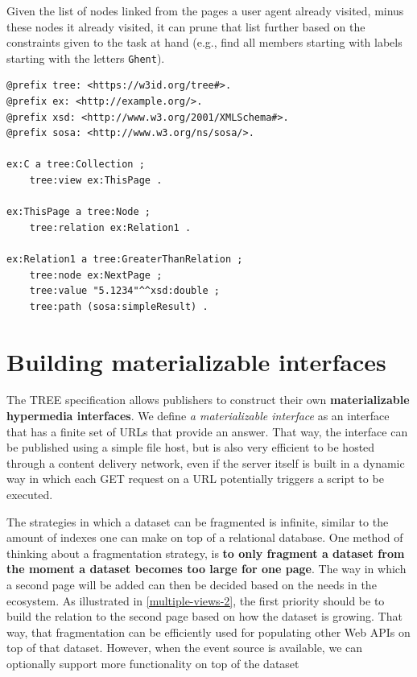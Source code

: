 \documentclass[
]{ceurart}
\begin{document}
Given the list of nodes linked from the pages a user agent already visited, minus these nodes it already visited, it can prune that list further based on the constraints given to the task at hand (e.g., find all members starting with labels starting with the letters \texttt{Ghent}).

\begin{lstlisting}[language=SPARQL,upquote=true,label=TREE-code-sample,caption={A Turtle example of an \texttt{ex:ThisPage} that links to a \texttt{ex:NextPage} through a GreaterThanRelation. A client can assume it must follow the page if its task needs members with a \texttt{sosa:simpleResult} greater than \texttt{5.1234}, to be compared using the double datatype.}]
@prefix tree: <https://w3id.org/tree#>.
@prefix ex: <http://example.org/>.
@prefix xsd: <http://www.w3.org/2001/XMLSchema#>.
@prefix sosa: <http://www.w3.org/ns/sosa/>.

ex:C a tree:Collection ;
    tree:view ex:ThisPage .

ex:ThisPage a tree:Node ;
    tree:relation ex:Relation1 .

ex:Relation1 a tree:GreaterThanRelation ;
    tree:node ex:NextPage ;
    tree:value "5.1234"^^xsd:double ;
    tree:path (sosa:simpleResult) .
\end{lstlisting}


\section{Building materializable interfaces}
\label{sec:method}

The TREE specification allows publishers to construct their own \textbf{materializable hypermedia interfaces}.
We define \textit{a materializable interface} as an interface that has a finite set of URLs that provide an answer.
That way, the interface can be published using a simple file host, but is also very efficient to be hosted through a content delivery network, even if the server itself is built in a dynamic way in which each GET request on a URL potentially triggers a script to be executed.

The strategies in which a dataset can be fragmented is infinite, similar to the amount of indexes one can make on top of a relational database.
One method of thinking about a fragmentation strategy, is \textbf{to only fragment a dataset from the moment a dataset becomes too large for one page}.
The way in which a second page will be added can then be decided based on the needs in the ecosystem.
As illustrated in \cref{multiple-views-2}, the first priority should be to build the relation to the second page based on how the dataset is growing.
That way, that fragmentation can be efficiently used for populating other Web APIs on top of that dataset.
However, when the event source is available, we can optionally support more functionality on top of the dataset
\end{document}
